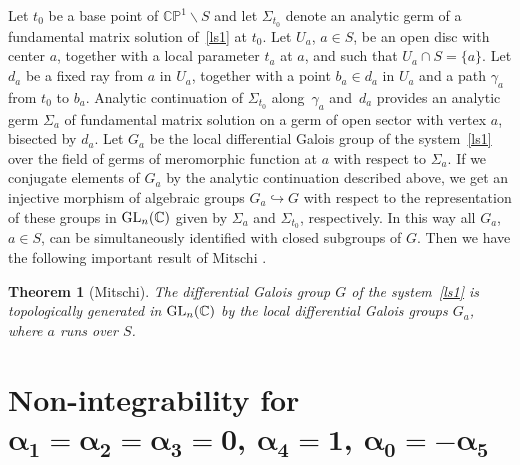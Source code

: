 \documentclass[10pt,a4paper]{amsart}
\numberwithin{equation}{section}
\newtheorem{Theorem}{Theorem}[section]
\begin{document}
 Let $t_0$ be a base point of $\mathbb{C}\mathbb{P}^1 \backslash S$ and
 let $\Sigma_{t_0}$ denote an analytic germ of a fundamental matrix solution of~\eqref{ls1} at $t_0$. Let $U_a$, $a\in S$, be an open disc with center $a$,
 together with a local parameter $t_a$ at $a$, and such that $U_a \cap S=\{a\}$. Let $d_a$ be a fixed ray from $a$ in $U_a$, together with a point
$b_a\in d_a$ in $U_a$ and a path $\gamma_a$ from $t_0$ to $b_a$. Analytic continuation of $\Sigma_{t_0}$ along~$\gamma_a$ and~$d_a$ provides
an analytic germ $\Sigma_a$ of fundamental matrix solution on a germ of open sector with vertex $a$, bisected by $d_a$. Let $G_a$ be the local differential Galois group
of the system~\eqref{ls1} over the field of germs of meromorphic function at $a$ with respect to $\Sigma_a$. If we conjugate elements of $G_a$ by the analytic continuation
described above, we get an injective morphism of algebraic groups $G_a \hookrightarrow G$ with respect to the representation of these groups in
 ${\rm GL}_n(\mathbb{C})$ given by $\Sigma_a$ and $\Sigma_{t_0}$, respectively. In this way all $G_a$, $a\in S$, can be simultaneously identified with closed subgroups of $G$.
 Then we have the following important result of Mitschi \cite[Proposition 1.3]{Mi}.

 \begin{Theorem}[Mitschi]\label{Mi}
 The differential Galois group $G$ of the system~\eqref{ls1} is topologically generated in ${\rm GL}_n(\mathbb{C})$
 by the local differential Galois groups $G_a$, where $a$ runs over $S$.
 \end{Theorem}

 \section[Non-integrability for alpha\_1=alpha\_2=alpha\_3=0, alpha\_4=1, alpha\_0=-alpha\_5]{Non-integrability for $\boldsymbol{\alpha_1=\alpha_2=\alpha_3=0}$, $\boldsymbol{\alpha_4=1}$, $\boldsymbol{\alpha_0=-\alpha_5}$}\label{section3}
\end{document}
